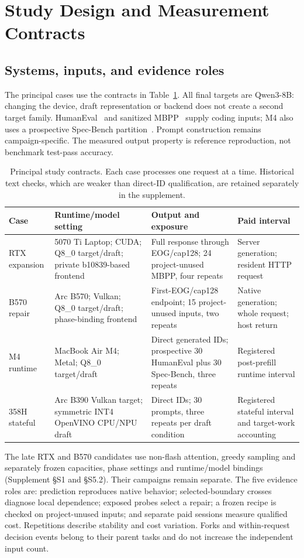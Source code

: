 \section{Study Design and Measurement Contracts}
\label{sec:methods}
\subsection{Systems, inputs, and evidence roles}
The principal cases use the contracts in Table~\ref{tab:contracts}. All final targets are Qwen3-8B: changing the device, draft representation or backend does not create a second target family. HumanEval~\cite{humaneval} and sanitized MBPP~\cite{mbpp} supply coding inputs; M4 also uses a prospective Spec-Bench partition~\cite{specbench}. Prompt construction remains campaign-specific. The measured output property is reference reproduction, not benchmark test-pass accuracy.

\begin{table}[t]\centering\small
\caption{Principal study contracts. Each case processes one request at a time. Historical text checks, which are weaker than direct-ID qualification, are retained separately in the supplement.}
\label{tab:contracts}
\begin{tabularx}{\linewidth}{@{}p{.17\linewidth}p{.26\linewidth}XX@{}}\toprule
Case & Runtime/model setting & Output and exposure & Paid interval\\\midrule
RTX expansion & 5070 Ti Laptop; CUDA; Q8\_0 target/draft; private b10839-based frontend & Full response through EOG/cap128; 24 project-unused MBPP, four repeats & Server generation; resident HTTP request\\
B570 repair & Arc B570; Vulkan; Q8\_0 target/draft; phase-binding frontend & First-EOG/cap128 endpoint; 15 project-unused inputs, two repeats & Native generation; whole request; host return\\
M4 runtime & MacBook Air M4; Metal; Q8\_0 target/draft & Direct generated IDs; prospective 30 HumanEval plus 30 Spec-Bench, three repeats & Registered post-prefill runtime interval\\
358H stateful & Arc B390 Vulkan target; symmetric INT4 OpenVINO CPU/NPU draft & Direct IDs; 30 prompts, three repeats per draft condition & Registered stateful interval and target-work accounting\\\bottomrule
\end{tabularx}
\end{table}

The late RTX and B570 candidates use non-flash attention, greedy sampling and separately frozen capacities, phase settings and runtime/model bindings (Supplement \S S1 and \S S5.2). Their campaigns remain separate. The five evidence roles are: prediction reproduces native behavior; selected-boundary crosses diagnose local dependence; exposed probes select a repair; a frozen recipe is checked on project-unused inputs; and separate paid sessions measure qualified cost. Repetitions describe stability and cost variation. Forks and within-request decision events belong to their parent tasks and do not increase the independent input count.

